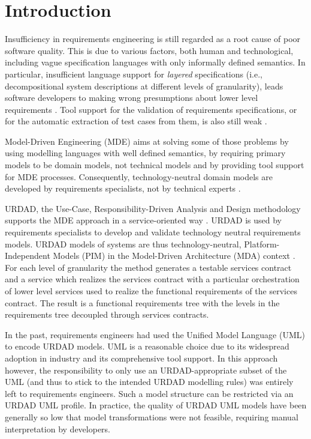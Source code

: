 \section{Introduction}
Insufficiency in requirements engineering is still regarded as a root cause of poor software quality. This is due to various factors, both human and technological, including vague specification languages with only informally defined semantics. In particular, insufficient language support for \emph{layered} specifications (i.e., decompositional system descriptions at different levels of granularity), leads software developers to making wrong presumptions about lower level requirements \cite{espana_evaluating_2009}. Tool support for the validation of requirements specifications, or for the automatic extraction of test cases from them, is also still weak \cite{bashardoust-tajali_extracting_2008}.

Model-Driven Engineering (MDE) \cite{schmidt_model_2006} aims at solving some of those problems by using modelling languages with well defined semantics, by requiring primary models to be domain models, not technical models \cite{asnina_computation_2010} and by providing tool support for MDE processes. Consequently, technology-neutral domain models are developed by requirements specialists, not by technical experts \cite{asnina_computation_2010}.

URDAD, the Use-Case, Responsibility-Driven Analysis and Design methodology \cite{fritz_solms_technology_2007} supports the MDE approach in a service-oriented way \cite{solms_urdad_2010}. URDAD is used by requirements specialists to develop and validate 
technology neutral requirements models. URDAD models of systems are thus technology-neutral, Platform-Independent Models (PIM) 
in the Model-Driven Architecture (MDA) context \cite{solms_urdad_2010}. For each level of granularity the method generates a testable services contract and a service which realizes the services contract with a particular orchestration of lower level services used to realize the functional requirements of the services contract. The result is a functional requirements tree with the levels in the requirements tree decoupled through services contracts.

In the past, requirements engineers had used the Unified Model Language (UML) to encode URDAD models. UML is a reasonable choice due to its widespread adoption in industry and its comprehensive tool support. In this approach however, the responsibility to only use an URDAD-appropriate subset of the UML (and thus to stick to the intended URDAD modelling rules) was entirely left to requirements engineers. Such a model structure can be restricted via an URDAD UML profile. In practice, the quality of URDAD UML models have been generally so low that model transformations were not feasible, requiring manual interpretation by developers.

